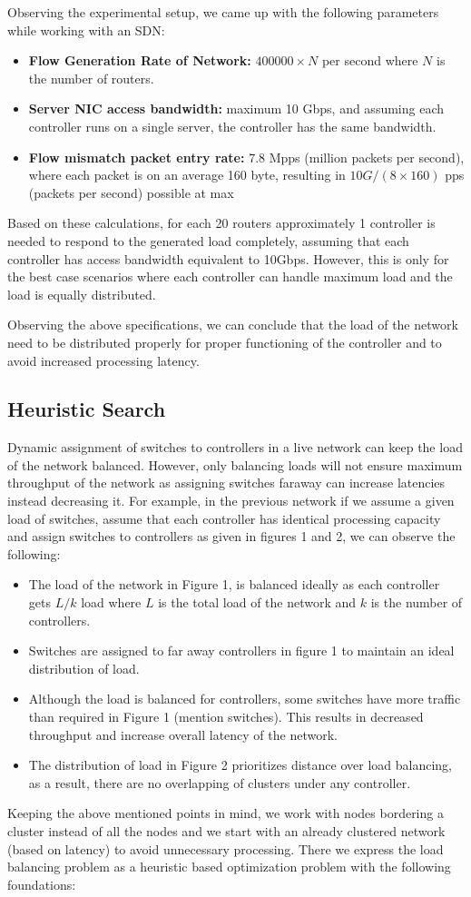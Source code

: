 \documentclass{article}
\begin{document}
	Observing the experimental setup, we came up with the following parameters while working with an SDN:
	\begin{itemize}
		\item \textbf{Flow Generation Rate of Network:} $400000 \times N$ per second where $N$ is the number of routers.
		\item \textbf{Server NIC access bandwidth:} maximum 10 Gbps, and assuming each controller runs on a single server, the controller has the same bandwidth.
		\item \textbf{Flow mismatch packet entry rate:} 7.8 Mpps (million packets per second), where each packet is on an average 160 byte, resulting in $10G/(8\times 160)$ pps (packets per second) possible at max
	\end{itemize}
	Based on these calculations, for each 20 routers approximately 1 controller is needed to respond to the generated load completely, assuming that each controller has access bandwidth equivalent to 10Gbps. However, this is only for the best case scenarios where each controller can handle maximum load and the load is equally distributed.

	Observing the above specifications, we can conclude that the load of the network need to be distributed properly for proper functioning of the controller and to avoid increased processing latency.
	
	\subsection{Heuristic Search}
	Dynamic assignment of switches to controllers in a live network can keep the load of the network balanced. However, only balancing loads will not ensure maximum throughput of the network as assigning switches faraway can increase latencies instead decreasing it. For example, in the previous network if we assume a given load of switches, assume that each controller has identical processing capacity and assign switches to controllers as given in figures 1 and 2, we can observe the following:
	\begin{itemize}
		\item The load of the network in Figure 1, is balanced ideally as each controller gets $L/k$ load where $L$ is the total load of the network and $k$ is the number of controllers.
		\item Switches are assigned to far away controllers in figure 1 to maintain an ideal distribution of load.
		\item Although the load is balanced for controllers, some switches have more traffic than required in Figure 1 (mention switches). This results in decreased throughput and increase overall latency of the network.
		\item The distribution of load in Figure 2 prioritizes distance over load balancing, as a result, there are no overlapping of clusters under any controller.
	\end{itemize}
	Keeping the above mentioned points in mind, we work with nodes bordering a cluster instead of all the nodes and we start with an already clustered network (based on latency) to avoid unnecessary processing. There we express the load balancing problem as a heuristic based optimization problem with the following foundations:
\end{document}

